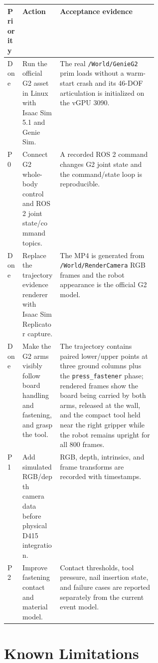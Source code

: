 \documentclass[11pt,a4paper]{article}
\begin{document}
\begin{tabularx}{\linewidth}{@{}p{0.10\linewidth}p{0.25\linewidth}X@{}}
\toprule
\textbf{Priority} & \textbf{Action} & \textbf{Acceptance evidence} \\
\midrule
Done & Run the official G2 asset in Linux with Isaac Sim 5.1 and Genie Sim. &
     The real \texttt{/World/GenieG2} prim loads without a warm-start crash and its
     46-DOF articulation is initialized on the vGPU 3090. \\
P0 & Connect G2 whole-body control and ROS 2 joint state/command topics. &
     A recorded ROS 2 command changes G2 joint state and the command/state loop is
     reproducible. \\
Done & Replace the trajectory evidence renderer with Isaac Sim Replicator capture. &
     The MP4 is generated from \texttt{/World/RenderCamera} RGB frames and the
     robot appearance is the official G2 model. \\
Done & Make the G2 arms visibly follow board handling and fastening, and grasp the tool. &
     The trajectory contains paired lower/upper points at three ground columns plus
     the \texttt{press\_fastener} phase; rendered frames show the board being carried
     by both arms, released at the wall, and the compact tool held near the right
     gripper while the robot remains upright for all 800 frames. \\
P1 & Add simulated RGB/depth camera data before physical D415 integration. &
     RGB, depth, intrinsics, and frame transforms are recorded with timestamps. \\
P2 & Improve fastening contact and material model. &
     Contact thresholds, tool pressure, nail insertion state, and failure cases are
     reported separately from the current event model. \\
\bottomrule
\end{tabularx}

\section{Known Limitations}
\end{document}
